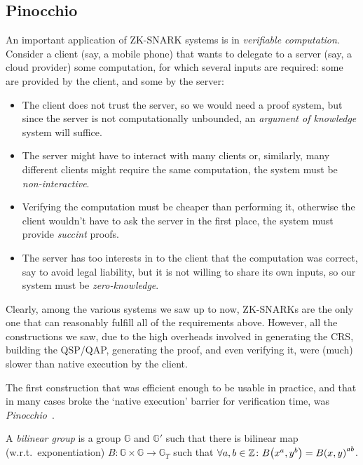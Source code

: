 \subsection{Pinocchio}
An important application of ZK-SNARK systems is in \emph{verifiable computation}.
Consider a client (say, a mobile phone) that wants to delegate to a server (say, a cloud provider) 
some computation, for which several inputs are required: some are provided by the client, 
and some by the server:
\begin{itemize}
  \item The client does not trust the server, so we would need a proof system, but since the server 
        is not computationally unbounded, an \emph{argument of knowledge} system will suffice.
  \item The server might have to interact with many clients or, similarly, many different clients
        might require the same computation, the system must be \emph{non-interactive}.
  \item Verifying the computation must be cheaper than performing it, otherwise the client wouldn't 
        have to ask the server in the first place, the system must provide \emph{succint} proofs.
  \item The server has too interests in to the client that the computation was correct, say to 
        avoid legal liability, but it is not willing to share its own inputs, so our system must
        be \emph{zero-knowledge}.
\end{itemize}
Clearly, among the various systems we saw up to now, ZK-SNARKs are the only one that can reasonably 
fulfill all of the requirements above.
However, all the constructions we saw, due to the high overheads involved in generating the CRS, 
building the QSP/QAP, generating the proof, and even verifying it, were (much) slower than native 
execution by the client.

The first construction that was efficient enough to be usable in practice, and that in many cases
broke the `native execution' barrier for verification time, was 
\emph{Pinocchio}~\cite{ParnoGHR2013}.
\begin{definition}
  A \emph{bilinear group} is a group \(\mathbb{G}\) and \(\mathbb{G}'\) 
  such that there is bilinear map (w.r.t.\ exponentiation) 
  \(B\colon \mathbb{G} \times \mathbb{G} \to \mathbb{G}_T\) such that 
  \(\forall a, b \in \mathbb{Z}\colon \call{B}{x^a, y^b} = \call{B}{x, y}^{ab}\).
\end{definition}

